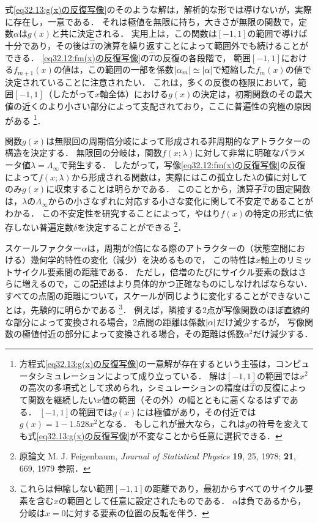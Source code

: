 式\eqref{eq32.13:g(x)の反復写像}のそのような解は，解析的な形では導けないが，実際に存在し，一意である．
それは極値を無限に持ち，大きさが無限の関数で，定数$\alpha$は$g(x)$と共に決定される．
実用上は，この関数は$[-1,1]$の範囲で導けば十分であり，その後は$\hat{T}$の演算を繰り返すことによって範囲外でも続けることができる．
\eqref{eq32.12:fm(x)の反復写像}の$\hat{T}$の反復の各段階で，
範囲$[-1,1]$における$f_{m+1}(x)$の値は，この範囲の一部を係数$\abs{\alpha_m}\simeq \abs{\alpha}$で短縮した$f_m(x)$の値で決定されていることに注意されたい．
これは，多くの反復の極限において，範囲$[-1,1]$（したがって$x$軸全体）における$g(x)$の決定は，初期関数のその最大値の近くのより小さい部分によって支配されており，ここに普遍性の究極の原因がある
\footnote{
方程式\eqref{eq32.13:g(x)の反復写像}の一意解が存在するという主張は，コンピュータシミュレーションによって成り立っている．
解は$[-1,1]$の範囲では$x^2$の高次の多項式として求められ，シミュレーションの精度は$\hat{T}$の反復によって関数を継続したい$x$値の範囲（その外）の幅とともに高くなるはずである．
$[-1,1]$の範囲では$g(x)$には極値があり，その付近では$g(x)=1-1.528x^2$となる．
もしこれが最大なら，これは$g$の符号を変えても式\eqref{eq32.13:g(x)の反復写像}が不変なことから任意に選択できる．
}．



関数$g(x)$は無限回の周期倍分岐によって形成される非周期的なアトラクターの構造を決定する．
無限回の分岐は，関数$f(x;\lambda)$に対して非常に明確なパラメータ値$\lambda=\Lambda_\infty$で発生する．
したがって，写像\eqref{eq32.12:fm(x)の反復写像}の反復によって$f(x;\lambda)$から形成される関数は，実際にはこの孤立した$\lambda$の値に対してのみ$g(x)$に収束することは明らかである．
このことから，演算子$\hat{T}$の固定関数は，$\lambda$の$\Lambda_\infty$からの小さなずれに対応する小さな変化に関して不安定であることがわかる．
この不安定性を研究することによって，やはり$f(x)$の特定の形式に依存しない普遍定数$\delta$を決定することができる
\footnote{
原論文
M. J. Feigenbaum, \textit{Journal of Statistical Physics} \textbf{19}, 25, 1978; \textbf{21}, 669, 1979
参照．}．



スケールファクター$\alpha$は，周期が2倍になる際のアトラクターの（状態空間における）幾何学的特性の変化（減少）を決めるもので，
この特性は$x$軸上のリミットサイクル要素間の距離である．
ただし，倍増のたびにサイクル要素の数はさらに増えるので，この記述はより具体的かつ正確なものにしなければならない．
すべての点間の距離について，スケールが同じように変化することができないことは，先験的に明らかである
\footnote{これらは伸縮しない範囲$[-1,1]$の距離であり，最初からすべてのサイクル要素を含む$x$の範囲として任意に設定されたものである．
$\alpha$は負であるから，分岐は$x=0$に対する要素の位置の反転を伴う．}．
例えば，隣接する2点が写像関数のほぼ直線的な部分によって変換される場合，2点間の距離は係数$\abs{\alpha}$だけ減少するが，
写像関数の極値付近の部分によって変換される場合，その距離は係数$\alpha^2$だけ減少する．



